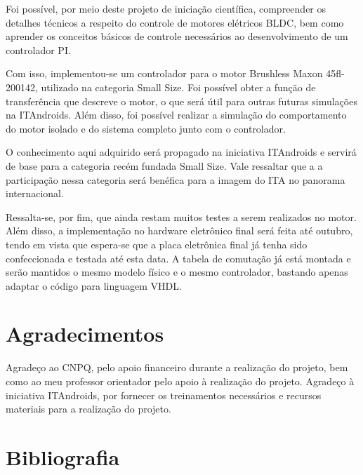 \documentclass[a4paper,11pt]{article}
\begin{document}
	Foi possível, por meio deste projeto de iniciação científica, compreender os detalhes técnicos a respeito do controle de motores elétricos BLDC, bem como aprender os conceitos básicos de controle necessários ao desenvolvimento de um controlador PI.
	
	Com isso, implementou-se um controlador para o motor Brushless Maxon 45fl-200142, utilizado na categoria Small Size. Foi possível obter a função de transferência que descreve o motor, o que será útil para outras futuras simulações na ITAndroids. Além disso, foi possível realizar a simulação do comportamento do motor isolado e do sistema completo junto com o controlador.
	
	O conhecimento aqui adquirido será propagado na iniciativa ITAndroids e servirá de base para a categoria recém fundada Small Size. Vale ressaltar que a a participação nessa categoria será benéfica para a imagem do ITA no panorama internacional.
	
	Ressalta-se, por fim, que ainda restam muitos testes a serem realizados no motor. Além disso, a implementação no hardware eletrônico final será feita até outubro, tendo em vista que espera-se que a placa eletrônica final já tenha sido confeccionada e testada até esta data.  A tabela de comutação já está montada e serão mantidos o mesmo modelo físico e o mesmo controlador, bastando apenas adaptar o código para linguagem VHDL.
	
	\section{Agradecimentos}
	Agradeço ao CNPQ, pelo apoio financeiro durante a realização do projeto, bem como ao meu professor orientador pelo apoio à realização do projeto. Agradeço à iniciativa ITAndroids, por fornecer os treinamentos necessários e recursos materiais para a realização do projeto.
	
	\section{Bibliografia}
	\printbibliography[heading=none]
	
\end{document}

